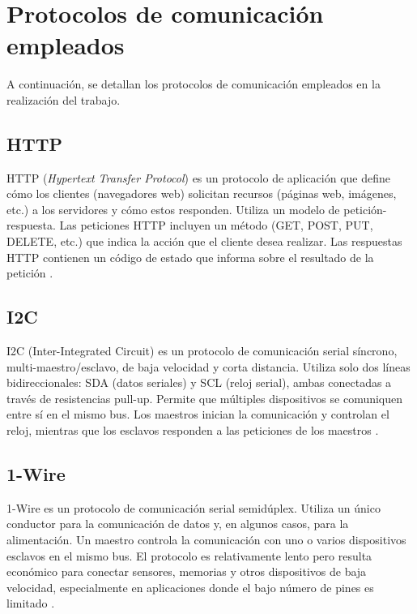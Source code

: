 \section{Protocolos de comunicación empleados}

A continuación, se detallan los protocolos de comunicación empleados en la realización del trabajo.

\subsection{HTTP}
HTTP (\textit{Hypertext Transfer Protocol}) es un protocolo de aplicación que define cómo los clientes (navegadores web) solicitan recursos (páginas web, imágenes, etc.) a los servidores y cómo estos responden. Utiliza un modelo de petición-respuesta. Las peticiones HTTP incluyen un método (GET, POST, PUT, DELETE, etc.) que indica la acción que el cliente desea realizar. Las respuestas HTTP contienen un código de estado que informa sobre el resultado de la petición \cite{HTTP}.

\subsection{I2C}
I2C (Inter-Integrated Circuit) es un protocolo de comunicación serial síncrono, multi-maestro/esclavo, de baja velocidad y corta distancia. Utiliza solo dos líneas bidireccionales: SDA (datos seriales) y SCL (reloj serial), ambas conectadas a través de resistencias pull-up. Permite que múltiples dispositivos se comuniquen entre sí en el mismo bus. Los maestros inician la comunicación y controlan el reloj, mientras que los esclavos responden a las peticiones de los maestros \cite{I2C}.

\subsection{1-Wire}
1-Wire es un protocolo de comunicación serial semidúplex. Utiliza un único conductor para la comunicación de datos y, en algunos casos, para la alimentación. Un maestro controla la comunicación con uno o varios dispositivos esclavos en el mismo bus. El protocolo es relativamente lento pero resulta económico para conectar sensores, memorias y otros dispositivos de baja velocidad, especialmente en aplicaciones donde el bajo número de pines es limitado \cite{1WIRE}.










